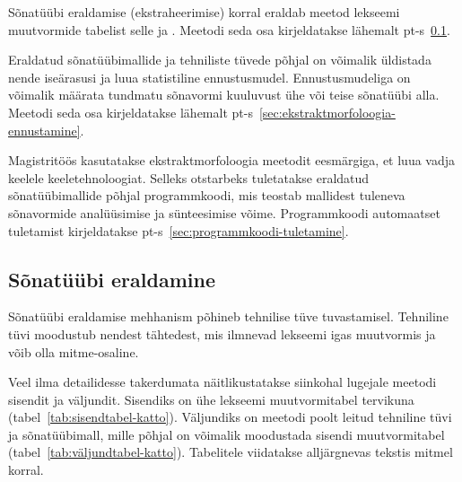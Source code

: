 \documentclass[12pt,a4paper]{article}
\begin{document}
Sõnatüübi eraldamise (ekstraheerimise) korral eraldab meetod lekseemi muutvormide tabelist selle  ja . Meetodi seda osa kirjeldatakse lähemalt pt-s~\ref{sec:ekstraktmorfoloogia-eraldamine}.

Eraldatud sõnatüübimallide ja tehniliste tüvede põhjal on võimalik üldistada nende iseärasusi ja luua statistiline ennustus\-mudel. Ennustus\-mudeliga on võimalik määrata tundmatu sõnavormi kuuluvust ühe või teise sõnatüübi alla. Meetodi seda osa kirjeldatakse lähemalt pt-s~\ref{sec:ekstraktmorfoloogia-ennustamine}.

Magistritöös kasutatakse ekstraktmorfoloogia meetodit eesmärgiga, et luua vadja keelele keele\-tehnoloogiat. Selleks otstarbeks tuletatakse eraldatud sõnatüübi\-mallide põhjal programm\-koodi, mis teostab mallidest tuleneva sõnavormide analüüsimise ja sünteesimise võime. Programm\-koodi automaatset tuletamist kirjeldatakse pt-s~\ref{sec:programmkoodi-tuletamine}.






\subsection{Sõnatüübi eraldamine}
\label{sec:ekstraktmorfoloogia-eraldamine}
Sõnatüübi eraldamise mehhanism põhineb tehnilise tüve tuvastamisel. Tehniline tüvi moodustub nendest tähtedest, mis ilmnevad lekseemi igas muutvormis ja võib olla mitme-osaline.

Veel ilma detailidesse takerdumata näitlikustatakse siinkohal lugejale meetodi sisendit ja väljundit. Sisendiks on ühe lekseemi muutvormitabel tervikuna (tabel~\ref{tab:sisendtabel-katto}). Väljundiks on meetodi poolt leitud tehniline tüvi ja sõna\-tüübi\-mall, mille põhjal on võimalik moodustada sisendi muutvormi\-tabel (tabel~\ref{tab:väljundtabel-katto}). Tabelitele viidatakse alljärgnevas tekstis mitmel korral.
\end{document}
